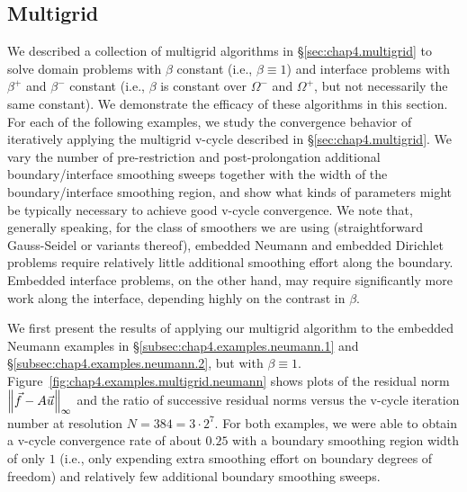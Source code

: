 \subsection{Multigrid} \label{subsec:chap4.examples.multigrid}

We described a collection of multigrid algorithms in \S\ref{sec:chap4.multigrid} to solve domain problems with $\beta$ constant (i.e., $\beta \equiv 1$) and interface problems with $\beta^+$ and $\beta^-$ constant (i.e., $\beta$ is constant over $\Omega^-$ and $\Omega^+$, but not necessarily the same constant). We demonstrate the efficacy of these algorithms in this section. For each of the following examples, we study the convergence behavior of iteratively applying the multigrid v-cycle described in \S\ref{sec:chap4.multigrid}. We vary the number of pre-restriction and post-prolongation additional boundary/interface smoothing sweeps together with the width of the boundary/interface smoothing region, and show what kinds of parameters might be typically necessary to achieve good v-cycle convergence. We note that, generally speaking, for the class of smoothers we are using (straightforward Gauss-Seidel or variants thereof), embedded Neumann and embedded Dirichlet problems require relatively little additional smoothing effort along the boundary. Embedded interface problems, on the other hand, may require significantly more work along the interface, depending highly on the contrast in $\beta$.

We first present the results of applying our multigrid algorithm to the embedded Neumann examples in \S\ref{subsec:chap4.examples.neumann.1} and \S\ref{subsec:chap4.examples.neumann.2}, but with $\beta \equiv 1$. Figure~\ref{fig:chap4.examples.multigrid.neumann} shows plots of the residual norm $\left\lVert  \vec{f} - A\vec{u}  \right\rVert_{\infty}$ and the ratio of successive residual norms versus the v-cycle iteration number at resolution $N = 384 = 3 \cdot 2^7$. For both examples, we were able to obtain a v-cycle convergence rate of about $0.25$ with a boundary smoothing region width of only $1$ (i.e., only expending extra smoothing effort on boundary degrees of freedom) and relatively few additional boundary smoothing sweeps.

